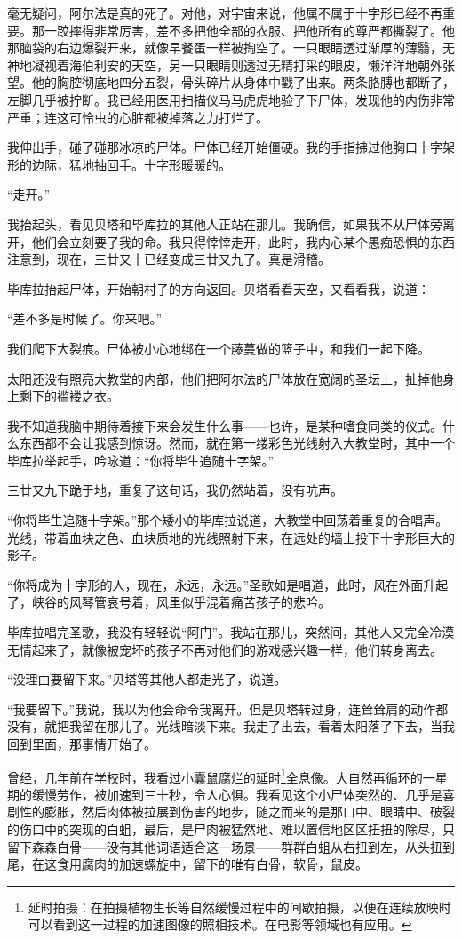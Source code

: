 \documentclass[AutoFakeBold=true]{book}
\begin{document}
毫无疑问，阿尔法是真的死了。对他，对宇宙来说，他属不属于十字形已经不再重要。那一跤摔得非常厉害，差不多把他全部的衣服、把他所有的尊严都撕裂了。他那脑袋的右边爆裂开来，就像早餐蛋一样被掏空了。一只眼睛透过渐厚的薄翳，无神地凝视着海伯利安的天空，另一只眼睛则透过无精打采的眼皮，懒洋洋地朝外张望。他的胸腔彻底地四分五裂，骨头碎片从身体中戳了出来。两条胳膊也都断了，左脚几乎被拧断。我已经用医用扫描仪马马虎虎地验了下尸体，发现他的内伤非常严重；连这可怜虫的心脏都被掉落之力打烂了。

我伸出手，碰了碰那冰凉的尸体。尸体已经开始僵硬。我的手指拂过他胸口十字架形的边际，猛地抽回手。十字形暖暖的。

``走开。''

我抬起头，看见贝塔和毕库拉的其他人正站在那儿。我确信，如果我不从尸体旁离开，他们会立刻要了我的命。我只得悻悻走开，此时，我内心某个愚痴恐惧的东西注意到，现在，三廿又十已经变成三廿又九了。真是滑稽。

毕库拉抬起尸体，开始朝村子的方向返回。贝塔看看天空，又看看我，说道：

``差不多是时候了。你来吧。''

我们爬下大裂痕。尸体被小心地绑在一个藤蔓做的篮子中，和我们一起下降。

太阳还没有照亮大教堂的内部，他们把阿尔法的尸体放在宽阔的圣坛上，扯掉他身上剩下的褴褛之衣。

我不知道我脑中期待着接下来会发生什么事——也许，是某种嗜食同类的仪式。什么东西都不会让我感到惊讶。然而，就在第一缕彩色光线射入大教堂时，其中一个毕库拉举起手，吟咏道：``你将毕生追随十字架。''

三廿又九下跪于地，重复了这句话，我仍然站着，没有吭声。

``你将毕生追随十字架。''那个矮小的毕库拉说道，大教堂中回荡着重复的合唱声。光线，带着血块之色、血块质地的光线照射下来，在远处的墙上投下十字形巨大的影子。

``你将成为十字形的人，现在，永远，永远。''圣歌如是唱道，此时，风在外面升起了，峡谷的风琴管哀号着，风里似乎混着痛苦孩子的悲吟。

毕库拉唱完圣歌，我没有轻轻说``阿门''。我站在那儿，突然间，其他人又完全冷漠无情起来了，就像被宠坏的孩子不再对他们的游戏感兴趣一样，他们转身离去。

``没理由要留下来。''贝塔等其他人都走光了，说道。

``我要留下。''我说，我以为他会命令我离开。但是贝塔转过身，连耸耸肩的动作都没有，就把我留在那儿了。光线暗淡下来。我走了出去，看着太阳落了下去，当我回到里面，那事情开始了。

曾经，几年前在学校时，我看过小囊鼠腐烂的延时\footnote{延时拍摄：在拍摄植物生长等自然缓慢过程中的间歇拍摄，以便在连续放映时可以看到这一过程的加速图像的照相技术。在电影等领域也有应用。}全息像。大自然再循环的一星期的缓慢劳作，被加速到三十秒，令人心惧。我看见这个小尸体突然的、几乎是喜剧性的膨胀，然后肉体被拉展到伤害的地步，随之而来的是那口中、眼睛中、破裂的伤口中的突现的白蛆，最后，是尸肉被猛然地、难以置信地区区扭扭的除尽，只留下森森白骨——没有其他词语适合这一场景——群群白蛆从右扭到左，从头扭到尾，在这食用腐肉的加速螺旋中，留下的唯有白骨，软骨，鼠皮。
\end{document}
